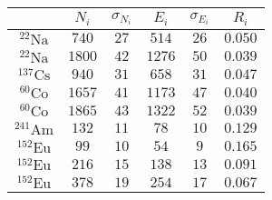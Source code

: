 \begin{tabular}{| c | c | c | c | c | c |}
\hline
{} & $N_i$ & $\sigma_{N_i}$ & $E_i$ & $\sigma_{E_i}$ & $R_i$\\
\hline
$^{22}\text{Na}$ & $740$ & $27$ & $514$ & $26$ & $0.050$\\
\hline
$^{22}\text{Na}$ & $1800$ & $42$ & $1276$ & $50$ & $0.039$\\
\hline
$^{137}\text{Cs}$ & $940$ & $31$ & $658$ & $31$ & $0.047$\\
\hline
$^{60}\text{Co}$ & $1657$ & $41$ & $1173$ & $47$ & $0.040$\\
\hline
$^{60}\text{Co}$ & $1865$ & $43$ & $1322$ & $52$ & $0.039$\\
\hline
$^{241}\text{Am}$ & $132$ & $11$ & $78$ & $10$ & $0.129$\\
\hline
$^{152}\text{Eu}$ & $99$ & $10$ & $54$ & $9$ & $0.165$\\
\hline
$^{152}\text{Eu}$ & $216$ & $15$ & $138$ & $13$ & $0.091$\\
\hline
$^{152}\text{Eu}$ & $378$ & $19$ & $254$ & $17$ & $0.067$\\
\hline
\end{tabular}
